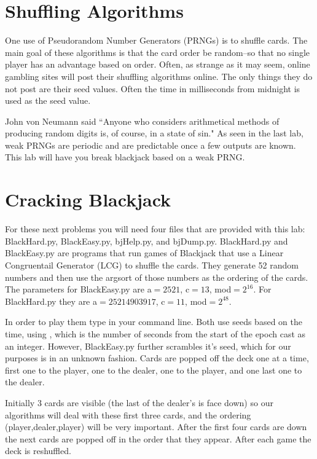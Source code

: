 \section*{Shuffling Algorithms}

One use of Pseudorandom Number Generators (PRNGs) is to shuffle cards.
The main goal of these algorithms is that the card order be random--so that no single player has an advantage based on order.
Often, as strange as it may seem, online gambling sites will post their shuffling algorithms online.
The only things they do not post are their seed values.
Often the time in milliseconds from midnight is used as the seed value.

John von Neumann said ``Anyone who considers arithmetical methods of producing random digits is, of course, in a state of sin."
As seen in the last lab, weak PRNGs are periodic and are predictable once a few outputs are known.
This lab will have you break blackjack based on a weak PRNG.

\section*{Cracking Blackjack}
For these next problems you will need four files that are provided with this lab: BlackHard.py, BlackEasy.py, bjHelp.py, and bjDump.py.
BlackHard.py and BlackEasy.py are programs that run games of Blackjack that use a Linear Congruentail Generator (LCG) to shuffle the cards.
They generate 52 random numbers and then use the argsort of those numbers as the ordering of the cards.
The parameters for BlackEasy.py are a$=2521$, c$=13$, mod$=2^{16}$.
For BlackHard.py they are a$=25214903917$, c$=11$, mod$=2^{48}$.

In order to play them type  in your command line.
Both use seeds based on the time, using , which is the number of seconds from the start of the epoch cast as an integer. However, BlackEasy.py further scrambles it's seed, which for our purposes is in an unknown fashion.
Cards are popped off the deck one at a time, first one to the player, one to the dealer, one to the player, and one last one to the dealer. 

Initially 3 cards are visible (the last of the dealer's is face down) so our algorithms will deal with these first three cards, and the ordering (player,dealer,player) will be very important. 
After the first four cards are down the next cards are popped off in the order that they appear. 
After each game the deck is reshuffled.


